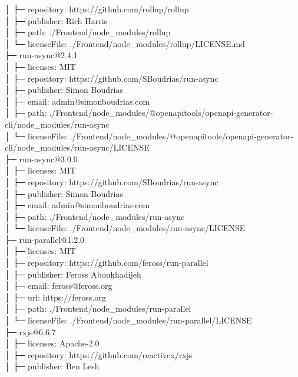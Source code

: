 \documentclass[
    paper=a4,
    twoside=false,
    parskip=half,
    listof=entryprefix,
    listof=totoc,
    index=totoc,
    bibliography=totoc,
    headsepline,
]{scrbook}
\begin{document}
    │  ├─ repository: https://github.com/rollup/rollup\\
    │  ├─ publisher: Rich Harris\\
    │  ├─ path: ./Frontend/node\_modules/rollup\\
    │  └─ licenseFile: ./Frontend/node\_modules/rollup/LICENSE.md\\
    ├─ run-async@2.4.1\\
    │  ├─ licenses: MIT\\
    │  ├─ repository: https://github.com/SBoudrias/run-async\\
    │  ├─ publisher: Simon Boudrias\\
    │  ├─ email: admin@simonboudrias.com\\
    │  ├─ path: ./Frontend/node\_modules/@openapitools/openapi-generator-cli/node\_modules/run-async\\
    │  └─ licenseFile: ./Frontend/node\_modules/@openapitools/openapi-generator-cli/node\_modules/run-async/LICENSE\\
    ├─ run-async@3.0.0\\
    │  ├─ licenses: MIT\\
    │  ├─ repository: https://github.com/SBoudrias/run-async\\
    │  ├─ publisher: Simon Boudrias\\
    │  ├─ email: admin@simonboudrias.com\\
    │  ├─ path: ./Frontend/node\_modules/run-async\\
    │  └─ licenseFile: ./Frontend/node\_modules/run-async/LICENSE\\
    ├─ run-parallel@1.2.0\\
    │  ├─ licenses: MIT\\
    │  ├─ repository: https://github.com/feross/run-parallel\\
    │  ├─ publisher: Feross Aboukhadijeh\\
    │  ├─ email: feross@feross.org\\
    │  ├─ url: https://feross.org\\
    │  ├─ path: ./Frontend/node\_modules/run-parallel\\
    │  └─ licenseFile: ./Frontend/node\_modules/run-parallel/LICENSE\\
    ├─ rxjs@6.6.7\\
    │  ├─ licenses: Apache-2.0\\
    │  ├─ repository: https://github.com/reactivex/rxjs\\
    │  ├─ publisher: Ben Lesh\\
\end{document}
